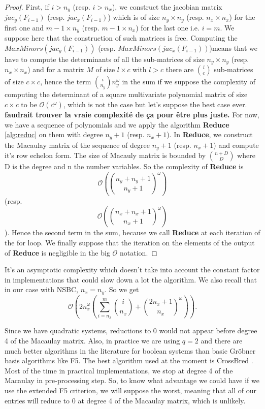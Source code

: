 \documentclass[english]{article}
\begin{document}
		 \begin{proof}
		 	First, if $i > n_y$ (resp. $i > n_x$), we construct the jacobian matrix $jac_y(F_{i-1})$ (resp. $jac_x(F_{i-1})$) which is of size $n_y \times n_y$ (resp. $n_x \times n_x$) for the first one and $m-1 \times n_y$ (resp. $m-1 \times n_x$) for the last one i.e. $i = m$. We suppose here that the construction of such matrices is free. Computing the $MaxMinors(jac_y(F_{i-1}))$ (resp. $MaxMinors(jac_x(F_{i-1}))$)means that we have to compute the determinants of all the sub-matrices of size $n_y \times n_y$ (resp. $n_x \times n_x$) and for a matrix $M$ of size $l \times c$ with $l > c$ there are $\binom{l}{c}$ sub-matrices of size $c \times c$, hence the term $\binom{i}{n_y}n_y^{\omega}$ in the sum if we suppose the complexity of computing the determinant of a square multivariate polynomial matrix of size $c \times c$ to be $\mathcal{O}(c^\omega)$, which is not the case but let's suppose the best case ever. \textbf{faudrait trouver la vraie complexité de ça pour être plus juste.}
		 	For now, we have a sequence of polynomials and we apply the algorithm \textbf{Reduce} \ref{alg:reduc} on them with degree $n_y + 1$ (resp. $n_x + 1$).
		 	In \textbf{Reduce}, we construct the Macaulay matrix of the sequence of degree $n_y + 1$ (resp. $n_x + 1$) and compute it's row echelon form.
		 	The size of Macauly matrix is bounded by $\binom{n + D}{D}$ where D is the degree and n the number variables. So the complexity of \textbf{Reduce} is $$\mathcal{O}\left(\binom{n_y + n_y + 1}{n_y + 1}^\omega \right)$$ (resp. $$\mathcal{O}\left(\binom{n_x + n_x + 1}{n_x + 1}^\omega \right)$$). Hence the second term in the sum, because we call \textbf{Reduce} at each iteration of the for loop. We finally suppose that the iteration on the elements of the output of \textbf{Reduce} is negligible in the big $\mathcal{O}$ notation.
		 \end{proof}
		 
		 It's an asymptotic complexity which doesn't take into account the constant factor in implementations that could slow down a lot the algorithm.
		 We also recall that in our case with NSBC, $n_x = n_y$. So we get
		 $$
		 \mathcal{O}\left(2n_x^{\omega}\left(\sum_{i = n_x}^{m} \binom{i}{n_x} + \binom{2n_x + 1}{n_x}^\omega\right)\right).
		 $$
		 
		 Since we have quadratic systems, reductions to 0 would not appear before degree 4 of the Macaulay matrix. Also, in practice we are using $q=2$ and there are much better algorithms in the literature for boolean systems than basic Gröbner basis algorithms like F5. The best algorithm used at the moment is CrossBred \cite{JV17}. Most of the time in practical implementations, we stop at degree 4 of the Macaulay in pre-processing step. So, to know what advantage we could have if we use the extended F5 criterion, we will suppose the worst, meaning that all of our entries will reduce to 0 at degree 4 of the Macaulay matrix, which is unlikely.
		 
\end{document}
